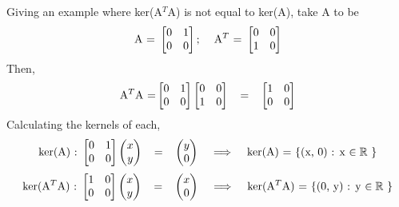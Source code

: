 \documentclass[12pt]{article}
\newcommand{\R}{\mathbb{R}}
\begin{document}
\begin{enumerate}[leftmargin=\labelsep]
\begin{enumerate}
    Giving an example where ker(A$^T$A) is not equal to ker(A), take A to be
    \[
    \text{A = }
    \begin{bmatrix}
        0   &1  \\
        0   &0
    \end{bmatrix}
    ; \hspace{4mm}
    \text{A$^T$ = } 
    \begin{bmatrix}
        0   &0  \\
        1   &0
    \end{bmatrix}
    \]
Then, 
\[
\text{A$^T$A =}
\begin{bmatrix}
    0   &1  \\
    0   &0
\end{bmatrix}
\begin{bmatrix}
    0   &0  \\
    1   &0
\end{bmatrix}
\hspace{3mm} =
\hspace{3mm}
\begin{bmatrix}
    1   &0  \\
    0   &0
\end{bmatrix}
\]
Calculating the kernels of each,
\[
\text{ker(A) : }
\begin{bmatrix}
    0   &1  \\
    0   &0
\end{bmatrix}
\begin{pmatrix}
    x   \\
    y
\end{pmatrix}
\hspace{3mm}
=
\hspace{3mm}
\begin{pmatrix}
    y   \\
    0
\end{pmatrix}
\hspace{3mm}
\implies
\hspace{3mm}
\text{ker(A) = $\{$(x, 0) : x $\in \R$ $\}$}
\]
\[
\text{ker(A$^T$A) : }
\begin{bmatrix}
    1   &0  \\
    0   &0  \\
\end{bmatrix}
\begin{pmatrix}
    x   \\
    y
\end{pmatrix}
\hspace{3mm}
=
\hspace{3mm}
\begin{pmatrix}
    x    \\
    0
\end{pmatrix}
\hspace{3mm}
\implies
\hspace{3mm}
\text{ker(A$^T$A) = $\{$(0, y) : y $\in \R$ $\}$}
\]


\end{enumerate}
\end{enumerate}
\end{document}
